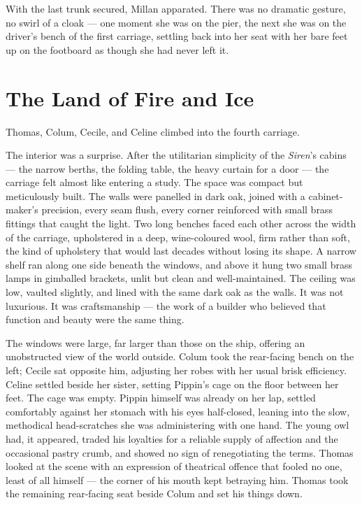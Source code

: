 With the last trunk secured, Millan apparated. There was no dramatic gesture, no swirl of a cloak --- one moment she was on the pier, the next she was on the driver's bench of the first carriage, settling back into her seat with her bare feet up on the footboard as though she had never left it.
 
\section*{The Land of Fire and Ice}
 
Thomas, Colum, Cecile, and Celine climbed into the fourth carriage.
 
The interior was a surprise. After the utilitarian simplicity of the \textit{Siren}'s cabins --- the narrow berths, the folding table, the heavy curtain for a door --- the carriage felt almost like entering a study. The space was compact but meticulously built. The walls were panelled in dark oak, joined with a cabinet-maker's precision, every seam flush, every corner reinforced with small brass fittings that caught the light. Two long benches faced each other across the width of the carriage, upholstered in a deep, wine-coloured wool, firm rather than soft, the kind of upholstery that would last decades without losing its shape. A narrow shelf ran along one side beneath the windows, and above it hung two small brass lamps in gimballed brackets, unlit but clean and well-maintained. The ceiling was low, vaulted slightly, and lined with the same dark oak as the walls. It was not luxurious. It was craftsmanship --- the work of a builder who believed that function and beauty were the same thing.
 
The windows were large, far larger than those on the ship, offering an unobstructed view of the world outside. Colum took the rear-facing bench on the left; Cecile sat opposite him, adjusting her robes with her usual brisk efficiency. Celine settled beside her sister, setting Pippin's cage on the floor between her feet. The cage was empty. Pippin himself was already on her lap, settled comfortably against her stomach with his eyes half-closed, leaning into the slow, methodical head-scratches she was administering with one hand. The young owl had, it appeared, traded his loyalties for a reliable supply of affection and the occasional pastry crumb, and showed no sign of renegotiating the terms. Thomas looked at the scene with an expression of theatrical offence that fooled no one, least of all himself --- the corner of his mouth kept betraying him. Thomas took the remaining rear-facing seat beside Colum and set his things down.
 
